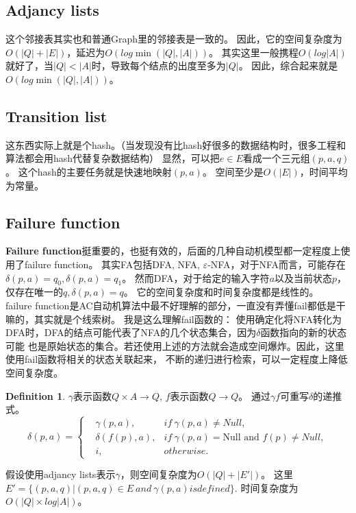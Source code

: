 \documentclass[UTF8]{ctexart}
\theoremstyle{definition}
\newtheorem{defn}[thm]{Definition}
\theoremstyle{remark}
\numberwithin{equation}{subsection}
\newcommand\Emph{\textbf}
\begin{document}
\subsection{Adjancy lists}
	
	这个邻接表其实也和普通Graph里的邻接表是一致的。
	因此，它的空间复杂度为$O(|Q| + |E|)$，延迟为$O(log \min(|Q|, |A|))$。
	其实这里一般携程$O(log |A|)$就好了，当$|Q|<|A|$时，导致每个结点的出度至多为$|Q|$。
	因此，综合起来就是$O(log \min(|Q|, |A|))$。
	
\subsection{Transition list}
	
	这东西实际上就是个hash。（当发现没有比hash好很多的数据结构时，很多工程和算法都会用hash代替复杂数据结构）
	显然，可以把$e \in E$看成一个三元组$(p, a, q)$。
	这个hash的主要任务就是快速地映射$(p,a)$。
	空间至少是$O(|E|)$，时间平均为常量。
	
\subsection{Failure function}
	
	\Emph{Failure function}挺重要的，也挺有效的，后面的几种自动机模型都一定程度上使用了failure function。
	其实FA包括DFA, NFA, $\varepsilon$-NFA，对于NFA而言，可能存在$\delta(p,a)=q_0, \delta(p,a)=q_1$。
	然而DFA，对于给定的输入字符$a$以及当前状态$p$，仅存在唯一的$q, \delta(p,a)=q$。
	它的空间复杂度和时间复杂度都是线性的。	\\
	
	failure function是AC自动机算法中最不好理解的部分，一直没有弄懂fail都低是干嘛的，其实就是个线索树。
	我是这么理解fail函数的：
	使用确定化将NFA转化为DFA时，DFA的结点可能代表了NFA的几个状态集合，因为$\delta$函数指向的新的状态可能
	也是原始状态的集合。若还使用上述的方法就会造成空间爆炸。因此，这里使用fail函数将相关的状态关联起来，
	不断的递归进行检索，可以一定程度上降低空间复杂度。
	
	\begin{defn}
		$\gamma$表示函数$Q \times A \rightarrow Q$, $f$表示函数$Q \rightarrow Q$。
		通过$\gamma f$可重写$\delta$的递推式。
		\[
			\delta(p,a) =
			\left\{
			\begin{aligned}
				&\gamma(p, a), 		&if\ \gamma(p, a) \neq Null,	              \\
				&\delta(f(p), a), 	&if\ \gamma(p, a) = \text{Null and } f(p) \neq Null,	\\
				&i,					&otherwise.
			\end{aligned}
			\right .
		\]
	\end{defn}
	假设使用adjancy lists表示$\gamma$，则空间复杂度为$O(|Q| + |E'|)$。
	这里$E' = \{(p,a,q) | (p,a,q) \in E \ and\ \gamma(p,a) is defined \}$.
	时间复杂度为$O(|Q| \times log |A|)$。
	
\end{document}
